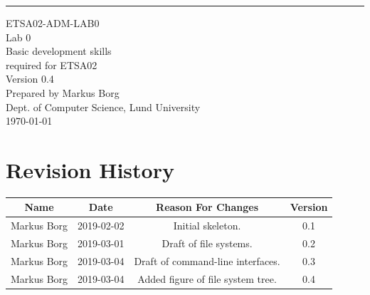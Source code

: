 \documentclass{scrreprt}
\date{}
\def\myversion{0.4 }
\begin{document}
\begin{flushright}
    \rule{16cm}{5pt}\vskip1cm
    \begin{bfseries}
    	\LARGE{ETSA02-ADM-LAB0}\\
    	\vspace{1.5cm}
        \Huge{Lab 0}\\
        \vspace{0.5cm}
        Basic development skills\\
        \vspace{0.5cm}
        required for ETSA02\\
        \vspace{1.5cm}
        \LARGE{Version \myversion}\\
        \vspace{1.5cm}
        Prepared by Markus Borg\\
        Dept. of Computer Science, Lund University\\
        \vspace{1.5cm}
        \today\\
    \end{bfseries}
\end{flushright}


\chapter*{Revision History}

\begin{center}
    \begin{tabular}{|c|c|c|c|}
        \hline
	    Name & Date & Reason For Changes & Version\\
        \hline
	    Markus Borg & 2019-02-02 & Initial skeleton. & 0.1\\
        \hline
        Markus Borg & 2019-03-01 & Draft of file systems. & 0.2\\
        \hline
        Markus Borg & 2019-03-04 & Draft of command-line interfaces. & 0.3\\
        \hline
        Markus Borg & 2019-03-04 & Added figure of file system tree. & 0.4\\
        \hline
    \end{tabular}
\end{center}
\end{document}
